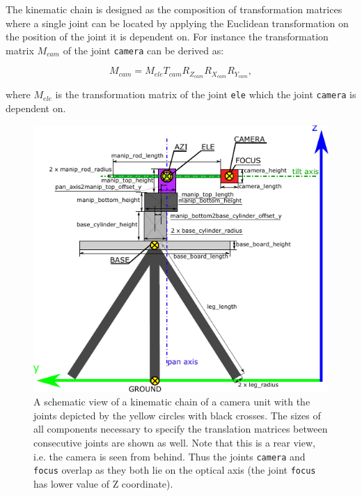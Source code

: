 The kinematic chain is designed as the composition of transformation matrices where a single joint can be located by applying the Euclidean transformation on the position of the joint it is dependent on. For instance the transformation matrix $M_{cam}$ of the joint \texttt{camera} can be derived as:

\begin{equation}
M_{cam} = M_{ele}T_{cam}R_{Z_{cam}}R_{X_{cam}}R_{Y_{cam}},
\end{equation}

where $M_{ele}$ is the transformation matrix of the joint \texttt{ele} which the joint \texttt{camera} is dependent on. 

\begin{figure}[htb]
	\centering
	\includegraphics[width=14cm]{fig/camera_unit_kinematic_chain.pdf}
	\caption{A schematic view of a kinematic chain of a camera unit with the joints depicted by the yellow circles with black crosses. The sizes of all components necessary to specify the translation matrices between consecutive joints are shown as well. Note that this is a rear view, i.e. the camera is seen from behind. Thus the joints \texttt{camera} and \texttt{focus} overlap as they both lie on the optical axis (the joint \texttt{focus} has lower value of Z coordinate).}
	\label{fig:camera_unit_kinematic_chain}
\end{figure}


